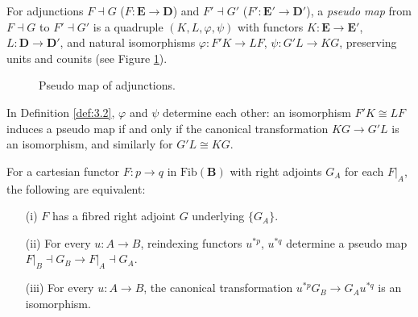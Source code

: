 \documentclass{article}
\begin{document}
\begin{definition}
\label{def:3.2}
For adjunctions $F \dashv G$ ($F : \mathbf{E} \to \mathbf{D}$) and $F' \dashv G'$ ($F' : \mathbf{E}' \to \mathbf{D}'$), a \emph{pseudo map} from $F \dashv G$ to $F' \dashv G'$ is a quadruple $(K, L, \varphi, \psi)$ with functors $K : \mathbf{E} \to \mathbf{E}'$, $L : \mathbf{D} \to \mathbf{D}'$, and natural isomorphisms $\varphi : F' K \to L F$, $\psi : G' L \to K G$, preserving units and counits (see Figure \ref{fig:pseudo-map}).
\begin{figure}[h]
    \centering
    \caption{Pseudo map of adjunctions.}
    \label{fig:pseudo-map}
\end{figure}
\end{definition}

\begin{lemma}
\label{lem:3.3}
In Definition \ref{def:3.2}, $\varphi$ and $\psi$ determine each other: an isomorphism $F' K \cong L F$ induces a pseudo map if and only if the canonical transformation $K G \to G' L$ is an isomorphism, and similarly for $G' L \cong K G$.
\end{lemma}

\begin{proposition}
\label{prop:3.4}
For a cartesian functor $F : p \to q$ in $\text{Fib}(\mathbf{B})$ with right adjoints $G_A$ for each $\left.F\right|_A$, the following are equivalent:
\begin{enumerate}
    \item[(i)] $F$ has a fibred right adjoint $G$ underlying $\{ G_A \}$.
    \item[(ii)] For every $u : A \to B$, reindexing functors $u^{*p}$, $u^{*q}$ determine a pseudo map $\left.F\right|_B \dashv G_B \to \left.F\right|_A \dashv G_A$.
    \item[(iii)] For every $u : A \to B$, the canonical transformation $u^{*p} G_B \to G_A u^{*q}$ is an isomorphism.
\end{enumerate}
\end{proposition}
\end{document}
